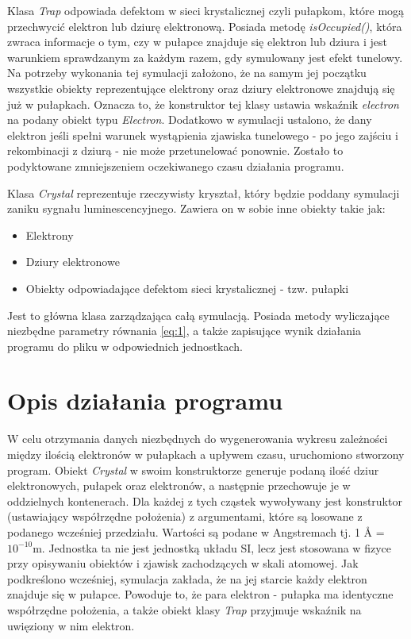 Klasa \textit{Trap} odpowiada defektom w sieci krystalicznej czyli pułapkom, które mogą przechwycić elektron lub dziurę elektronową. Posiada metodę \textit{isOccupied()}, która zwraca informacje o tym, czy w pułapce znajduje się elektron lub dziura i jest warunkiem sprawdzanym za każdym razem, gdy symulowany jest efekt tunelowy. Na potrzeby wykonania tej symulacji założono, że na samym jej początku wszystkie obiekty reprezentujące elektrony oraz dziury elektronowe znajdują się już w pułapkach. Oznacza to, że konstruktor tej klasy ustawia wskaźnik \textit{electron} na podany obiekt typu \textit{Electron}. Dodatkowo w symulacji ustalono, że dany elektron jeśli spełni warunek wystąpienia zjawiska tunelowego - po jego zajściu i rekombinacji z dziurą - nie może przetunelować ponownie. Zostało to podyktowane zmniejszeniem oczekiwanego czasu działania programu.

Klasa \textit{Crystal} reprezentuje rzeczywisty kryształ, który będzie poddany symulacji zaniku sygnału luminescencyjnego. Zawiera on w sobie inne obiekty takie jak:

\begin{itemize}
\item Elektrony
\item Dziury elektronowe
\item Obiekty odpowiadające defektom sieci krystalicznej - tzw. pułapki
\end{itemize}

Jest to główna klasa zarządzająca całą symulacją. Posiada metody wyliczające niezbędne parametry równania \ref{eq:1}, a także zapisujące wynik działania programu do pliku w odpowiednich jednostkach.





\section{Opis działania programu}



W celu otrzymania danych niezbędnych do wygenerowania wykresu zależności między ilością elektronów w pułapkach a upływem czasu, uruchomiono stworzony program. Obiekt \textit{Crystal} w swoim konstruktorze generuje podaną ilość dziur elektronowych, pułapek oraz elektronów, a następnie przechowuje je w oddzielnych kontenerach. Dla każdej z tych cząstek wywoływany jest konstruktor (ustawiający współrzędne położenia) z argumentami, które są losowane z podanego wcześniej przedziału. Wartości są podane w Angstremach tj. 1 Å = $10^{-10}$m. Jednostka ta nie jest jednostką układu SI, lecz jest stosowana w fizyce przy opisywaniu obiektów i zjawisk zachodzących w skali atomowej. Jak podkreślono wcześniej, symulacja zakłada, że na jej starcie każdy elektron znajduje się w pułapce. Powoduje to, że para elektron - pułapka ma identyczne współrzędne położenia, a także obiekt klasy \textit{Trap} przyjmuje wskaźnik na uwięziony w nim elektron.

